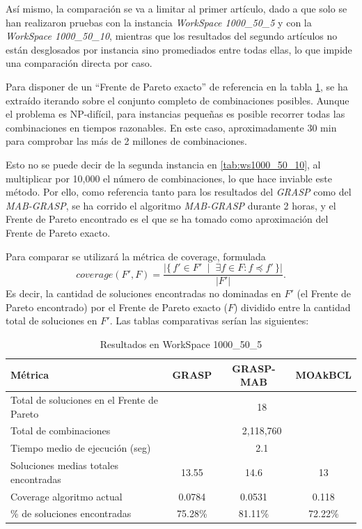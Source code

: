 \documentclass[12pt,a4paper]{book}
\begin{document}
Así mismo, la comparación se va a limitar al primer artículo, dado a que solo se han realizaron pruebas con la instancia \textit{WorkSpace 1000\_50\_5} y con la \textit{WorkSpace 1000\_50\_10}, mientras que los resultados del segundo artículos no están desglosados 
por instancia sino promediados entre todas ellas, lo que impide una comparación directa por caso.

Para disponer de un ``Frente de Pareto exacto'' de referencia en la tabla \ref{tab:ws1000_50_5}, se ha extraído iterando sobre el conjunto completo de combinaciones posibles.
Aunque el problema es NP-difícil, para instancias pequeñas es posible recorrer todas las combinaciones en tiempos razonables. En este caso, aproximadamente 30 min para comprobar las más de 2 millones de combinaciones. 

Esto no se puede decir de la segunda instancia en \ref{tab:ws1000_50_10}, al multiplicar por 10,000 el número de combinaciones, lo que hace inviable este método. Por ello, como referencia tanto para los resultados del \textit{GRASP} como del \textit{MAB-GRASP},
se ha corrido el algoritmo \textit{MAB-GRASP} durante 2 horas, y el Frente de Pareto encontrado es el que se ha tomado como aproximación del Frente de Pareto exacto.

Para comparar se utilizará la métrica de coverage, formulada
$$coverage(F',F) = \frac{\left| \{\, f' \in F' \;\mid\; \exists f \in F : f \preceq f' \,\} \right|}{|F'|}.$$
Es decir, la cantidad de soluciones encontradas no dominadas en $F'$ (el Frente de Pareto encontrado) por el Frente de Pareto exacto ($F$) dividido entre la cantidad total de soluciones en $F'$.
Las tablas comparativas serían las siguientes:

\begin{table}[H]
\centering
\caption{Resultados en WorkSpace 1000\_50\_5}
\label{tab:ws1000_50_5}
\begin{tabular}{|l|c|c|c|}
\hline
\textbf{Métrica} & \textbf{GRASP} & \textbf{GRASP-MAB} & \textbf{MOAkBCL} \\ \hline
Total de soluciones en el Frente de Pareto
    & \multicolumn{3}{c|}{18} \\ \hline
Total de combinaciones 
    & \multicolumn{3}{c|}{2,118,760} \\ \hline
Tiempo medio de ejecución (seg) 
    & \multicolumn{3}{c|}{2.1} \\ \hline
Soluciones medias totales encontradas & 13.55 & 14.6 & 13 \\ \hline
Coverage algoritmo actual & 0.0784 & 0.0531 & 0.118 \\ \hline
\% de soluciones encontradas & 75.28\% & 81.11\% & 72.22\% \\ \hline
\end{tabular}
\end{table}
\end{document}
